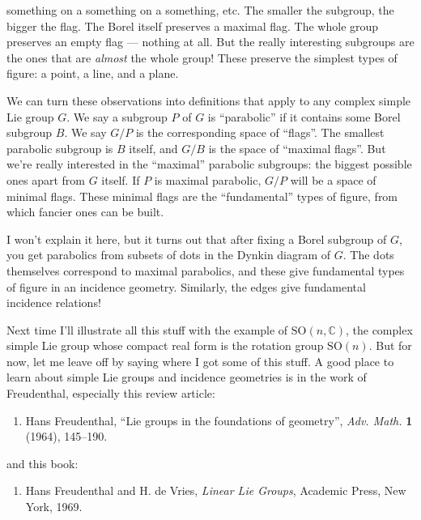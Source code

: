 \documentclass{article}
\def\tightlist{}
\begin{document}
something on a something on a something, etc. The smaller the subgroup,
the bigger the flag. The Borel itself preserves a maximal flag. The
whole group preserves an empty flag --- nothing at all. But the really
interesting subgroups are the ones that are \emph{almost} the whole
group! These preserve the simplest types of figure: a point, a line, and
a plane.

We can turn these observations into definitions that apply to any
complex simple Lie group \(G\). We say a subgroup \(P\) of \(G\) is
``parabolic'' if it contains some Borel subgroup \(B\). We say \(G/P\)
is the corresponding space of ``flags''. The smallest parabolic subgroup
is \(B\) itself, and \(G/B\) is the space of ``maximal flags''. But
we're really interested in the ``maximal'' parabolic subgroups: the
biggest possible ones apart from \(G\) itself. If \(P\) is maximal
parabolic, \(G/P\) will be a space of minimal flags. These minimal flags
are the ``fundamental'' types of figure, from which fancier ones can be
built.

I won't explain it here, but it turns out that after fixing a Borel
subgroup of \(G\), you get parabolics from subsets of dots in the Dynkin
diagram of \(G\). The dots themselves correspond to maximal parabolics,
and these give fundamental types of figure in an incidence geometry.
Similarly, the edges give fundamental incidence relations!

Next time I'll illustrate all this stuff with the example of
\(\mathrm{SO}(n,\mathbb{C})\), the complex simple Lie group whose
compact real form is the rotation group \(\mathrm{SO}(n)\). But for now,
let me leave off by saying where I got some of this stuff. A good place
to learn about simple Lie groups and incidence geometries is in the work
of Freudenthal, especially this review article:

\begin{enumerate}
\def\labelenumi{\arabic{enumi})}
\setcounter{enumi}{5}
\tightlist
\item
  Hans Freudenthal, ``Lie groups in the foundations of geometry'',
  \emph{Adv. Math.} \textbf{1} (1964), 145--190.
\end{enumerate}

and this book:

\begin{enumerate}
\def\labelenumi{\arabic{enumi})}
\setcounter{enumi}{6}
\tightlist
\item
  Hans Freudenthal and H. de Vries, \emph{Linear Lie Groups}, Academic
  Press, New York, 1969.
\end{enumerate}
\end{document}
